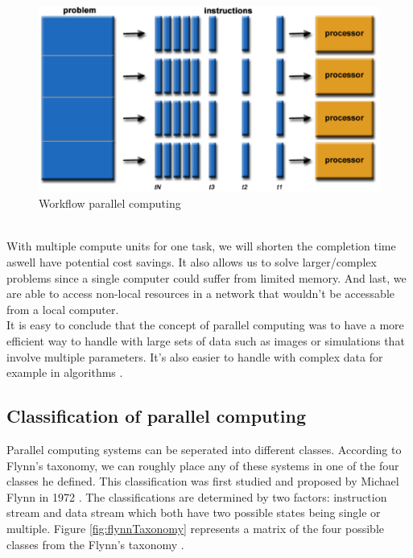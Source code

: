 \documentclass[a4paper, 11pt]{report}
\begin{document}
	\begin{figure}[h]
		\centering
		\includegraphics[scale=.4]{images/parallelProblem.pdf}
		\caption{Workflow parallel computing}
		\label{fig:ParallelC}
	\end{figure}\\
With multiple compute units for one task, we will shorten the completion time aswell have potential cost savings. It also allows us to solve larger/complex problems since a single computer could suffer from limited memory. And last, we are able to access non-local resources in a network that wouldn't be accessable from a local computer.\\ It is easy to conclude that the concept of parallel computing was to have a more efficient way to handle with large sets of data such as images or simulations that involve multiple parameters. It's also easier to handle with complex data for example in algorithms \cite{barney2012parallel}.

	\subsection{Classification of parallel computing}
Parallel computing systems can be seperated into different classes. According to Flynn's taxonomy, we can roughly place any of these systems in one of the four classes he defined. This classification was first studied and proposed by Michael Flynn in 1972 \cite{Unit2COPC}. The classifications are determined by two factors: instruction stream and data stream which both have two possible states being single or multiple. Figure \ref{fig:flynnTaxonomy} represents a matrix of the four possible classes from the Flynn's taxonomy \cite{barney2012parallel}.
\end{document}
